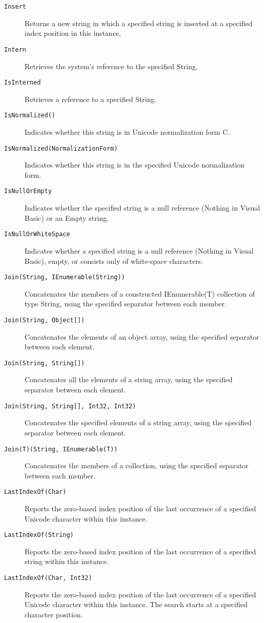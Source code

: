 \begin{description}
\item[\texttt{Insert}] Returns a new string in which a specified string is inserted at a specified index position in this instance.
\item[\texttt{Intern}] Retrieves the system's reference to the specified String.
\item[\texttt{IsInterned}] Retrieves a reference to a specified String.
\item[\texttt{IsNormalized()}] Indicates whether this string is in Unicode normalization form C.
\item[\texttt{IsNormalized(NormalizationForm)}] Indicates whether this string is in the specified Unicode normalization form.
\item[\texttt{IsNullOrEmpty}] Indicates whether the specified string is a null reference (Nothing in Visual Basic) or an Empty string.
\item[\texttt{IsNullOrWhiteSpace}] Indicates whether a specified string is a null reference (Nothing in Visual Basic), empty, or consists only of white-space characters.
\item[\texttt{Join(String, IEnumerable(String))}] Concatenates the members of a constructed IEnumerable(T) collection of type String, using the specified separator between each member.
\item[\texttt{Join(String, Object[])}] Concatenates the elements of an object array, using the specified separator between each element.
\item[\texttt{Join(String, String[])}] Concatenates all the elements of a string array, using the specified separator between each element.
\item[\texttt{Join(String, String[], Int32, Int32)}] Concatenates the specified elements of a string array, using the specified separator between each element.
\item[\texttt{Join(T)(String, IEnumerable(T))}] Concatenates the members of a collection, using the specified separator between each member.
\item[\texttt{LastIndexOf(Char)}] Reports the zero-based index position of the last occurrence of a specified Unicode character within this instance.
\item[\texttt{LastIndexOf(String)}] Reports the zero-based index position of the last occurrence of a specified string within this instance.
\item[\texttt{LastIndexOf(Char, Int32)}] Reports the zero-based index position of the last occurrence of a specified Unicode character within this instance. The search starts at a specified character position.

\end{description}
